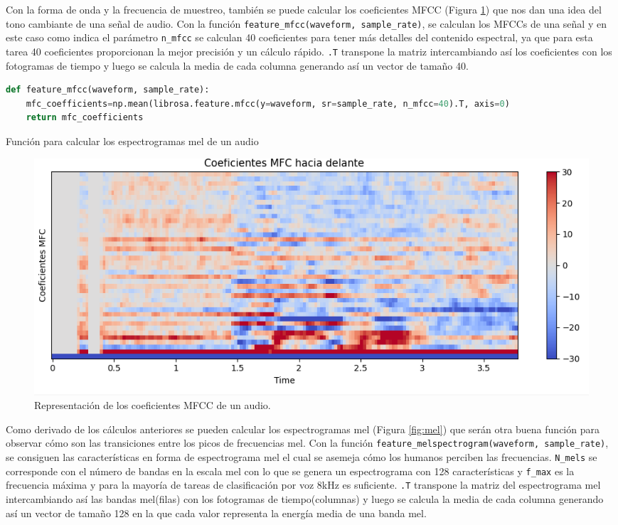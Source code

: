 Con la forma de onda y la frecuencia de muestreo, también se puede calcular los coeficientes MFCC (Figura \ref{fig:mfcc}) que nos dan una idea del tono cambiante de una señal de audio. Con la función \verb|feature_mfcc(waveform, sample_rate)|, se calculan los MFCCs de una señal y en este caso como indica el parámetro \texttt{n\_mfcc} se calculan 40 coeficientes para tener más detalles del contenido espectral, ya que para esta tarea 40 coeficientes proporcionan la mejor precisión y un cálculo rápido. \texttt{.T} transpone la matriz intercambiando así los coeficientes con los fotogramas de tiempo y luego se calcula la media de cada columna generando así un vector de tamaño 40.


\begin{code}[H]
\begin{lstlisting}[language=Python]
def feature_mfcc(waveform, sample_rate):
    mfc_coefficients=np.mean(librosa.feature.mfcc(y=waveform, sr=sample_rate, n_mfcc=40).T, axis=0)
    return mfc_coefficients
\end{lstlisting}
\caption[Función para calcular los espectrogramas mel de un audio]{Función para calcular los espectrogramas mel de un audio}
\label{cod:codejemplo5}
\end{code}

\begin{figure}[H]
  \centering
  \includegraphics[scale=0.4]{figs/coeficientes_mfc} %
  \caption{ Representación de los coeficientes MFCC de un audio.}
  \label{fig:mfcc}
\end{figure}

Como derivado de los cálculos anteriores se pueden calcular los espectrogramas mel (Figura \ref{fig:mel}) que serán otra buena función para observar cómo son las transiciones entre los picos de frecuencias mel. Con la función \verb|feature_melspectrogram(waveform, sample_rate)|, se consiguen las características en forma de espectrograma mel el cual se asemeja cómo los humanos perciben las frecuencias. \texttt{N\_mels} se corresponde con el número de bandas en la escala mel con lo que se genera un espectrograma con 128 características y \texttt{f\_max} es la frecuencia máxima y para la mayoría de tareas de clasificación por voz 8kHz es suficiente. \texttt{.T} transpone la matriz del espectrograma mel intercambiando así las bandas mel(filas) con los fotogramas de tiempo(columnas) y luego se calcula la media de cada columna generando así un vector de tamaño 128 en la que cada valor representa la energía media de una banda mel.



